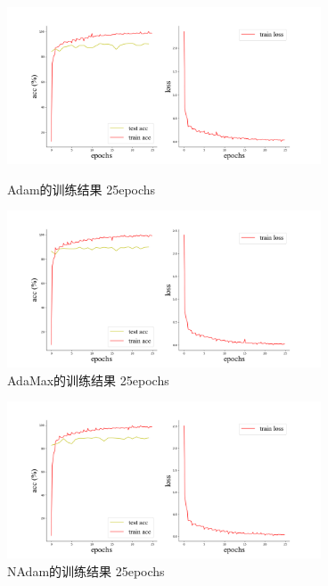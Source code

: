 \documentclass[10.5pt,a4paper]{article}%
\begin{document}
            \begin{figure}[H]
                    \centering
        	\begin{minipage}{0.48\textwidth}
        		\centering
        		\includegraphics[width=0.83\textwidth]{imgs_25e/adam.png}
        		\caption{\fontsize{10pt}{15pt}\selectfont Adam的训练结果 25epochs}
        	\end{minipage}
        	\hspace{0cm}%
        	\hfill%
        	\begin{minipage}{0.48\textwidth}
        		\centering
        		\includegraphics[width=0.83\textwidth]{imgs_25e/AdaMax.png}
        		\caption{\fontsize{10pt}{15pt}\selectfont AdaMax的训练结果 25epochs}
        	\end{minipage}
            \end{figure}  
            \begin{figure}[H]
                    \centering
        	\begin{minipage}{0.48\textwidth}
                    \centering
        		\includegraphics[width=0.83\textwidth]{imgs_25e/nadam.png}
        		\caption{\fontsize{10pt}{15pt}\selectfont NAdam的训练结果 25epochs}
        	\end{minipage}
            \end{figure}               
\end{document}
